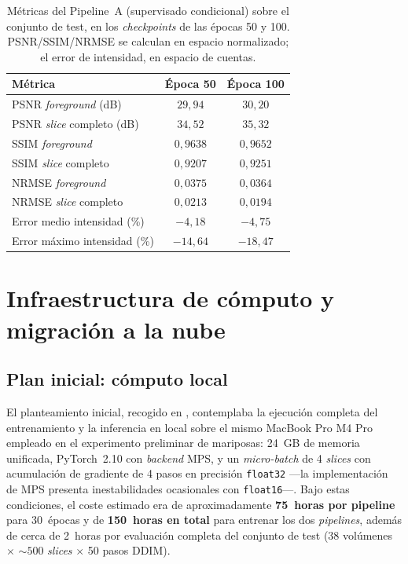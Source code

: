 \begin{table}[h!]
    \centering
    \begin{tabular}{lcc}
        \toprule
        Métrica & Época 50 & Época 100 \\
        \midrule
        PSNR \textit{foreground} (dB) & $29{,}94$ & $30{,}20$ \\
        PSNR \textit{slice} completo (dB) & $34{,}52$ & $35{,}32$ \\
        SSIM \textit{foreground} & $0{,}9638$ & $0{,}9652$ \\
        SSIM \textit{slice} completo & $0{,}9207$ & $0{,}9251$ \\
        NRMSE \textit{foreground} & $0{,}0375$ & $0{,}0364$ \\
        NRMSE \textit{slice} completo & $0{,}0213$ & $0{,}0194$ \\
        Error medio intensidad (\%) & $-4{,}18$ & $-4{,}75$ \\
        Error máximo intensidad (\%) & $-14{,}64$ & $-18{,}47$ \\
        \bottomrule
    \end{tabular}
    \caption{Métricas del Pipeline~A (supervisado condicional)
    sobre el conjunto de test, en los \textit{checkpoints} de las
    épocas 50 y 100. PSNR/SSIM/NRMSE se calculan en espacio
    normalizado; el error de intensidad, en espacio de cuentas.}
    \label{tab:pet-supervisado}
\end{table}


\section{Infraestructura de cómputo y migración a la nube}
\label{sec:pet-infraestructura}

\subsection{Plan inicial: cómputo local}

El planteamiento inicial, recogido en
, contemplaba la ejecución completa
del entrenamiento y la inferencia en local sobre el mismo MacBook
Pro M4 Pro empleado en el experimento preliminar de mariposas:
24~GB de memoria unificada, PyTorch~2.10 con \textit{backend}
MPS, y un \textit{micro-batch} de 4 \textit{slices} con
acumulación de gradiente de 4 pasos en precisión \texttt{float32}
—la implementación de MPS presenta inestabilidades ocasionales
con \texttt{float16}—. Bajo estas condiciones, el coste estimado
era de aproximadamente \textbf{75~horas por pipeline} para
30~épocas y de \textbf{150~horas en total} para entrenar los dos
\textit{pipelines}, además de cerca de 2~horas por evaluación
completa del conjunto de test (38 volúmenes $\times$ $\sim 500$
\textit{slices} $\times$ 50 pasos DDIM).

